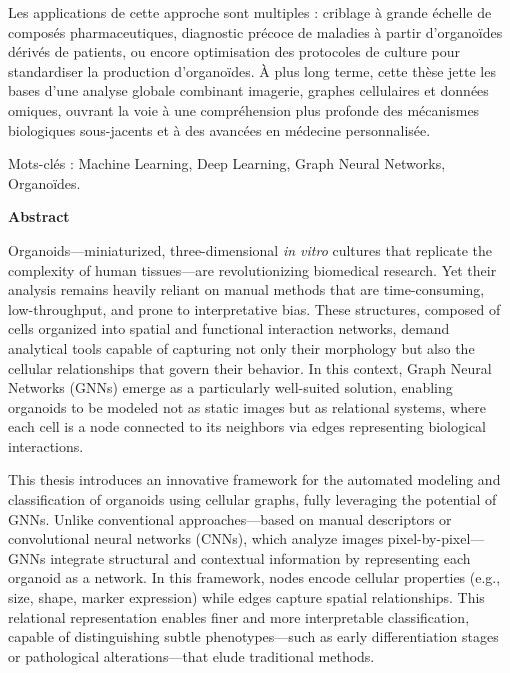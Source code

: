 Les applications de cette approche sont multiples : criblage à grande échelle de composés pharmaceutiques, diagnostic précoce de maladies à partir d'organoïdes dérivés de patients, ou encore optimisation des protocoles de culture pour standardiser la production d'organoïdes. À plus long terme, cette thèse jette les bases d'une analyse globale combinant imagerie, graphes cellulaires et données omiques, ouvrant la voie à une compréhension plus profonde des mécanismes biologiques sous-jacents et à des avancées en médecine personnalisée.

\vspace{0.5cm}
Mots-clés : Machine Learning, Deep Learning, Graph Neural Networks, Organoïdes.

\clearpage
\thispagestyle{empty}
\vspace*{-2cm}

\begin{center}
{\large\bfseries Abstract}\par
\vspace{0.4cm}
\end{center}

Organoids—miniaturized, three-dimensional \textit{in vitro} cultures that replicate the complexity of human tissues—are revolutionizing biomedical research. Yet their analysis remains heavily reliant on manual methods that are time-consuming, low-throughput, and prone to interpretative bias. These structures, composed of cells organized into spatial and functional interaction networks, demand analytical tools capable of capturing not only their morphology but also the cellular relationships that govern their behavior. In this context, Graph Neural Networks (GNNs) emerge as a particularly well-suited solution, enabling organoids to be modeled not as static images but as relational systems, where each cell is a node connected to its neighbors via edges representing biological interactions.

This thesis introduces an innovative framework for the automated modeling and classification of organoids using cellular graphs, fully leveraging the potential of GNNs. Unlike conventional approaches—based on manual descriptors or convolutional neural networks (CNNs), which analyze images pixel-by-pixel—GNNs integrate structural and contextual information by representing each organoid as a network. In this framework, nodes encode cellular properties (e.g., size, shape, marker expression) while edges capture spatial relationships. This relational representation enables finer and more interpretable classification, capable of distinguishing subtle phenotypes—such as early differentiation stages or pathological alterations—that elude traditional methods.

